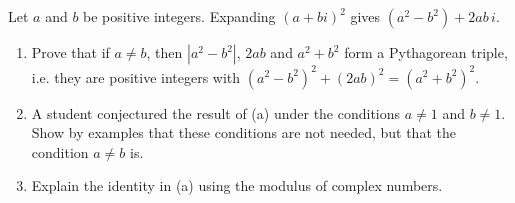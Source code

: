Let $a$ and $b$ be positive integers. Expanding $(a+bi)^2$ gives $\left(a^2-b^2\right)+2ab\,i$.
\begin{enumerate}
\item[(a)] Prove that if $a\ne b$, then $\left|a^2-b^2\right|$, $2ab$ and $a^2+b^2$ form a Pythagorean triple, i.e. they are positive integers with $\left(a^2-b^2\right)^2+(2ab)^2=\left(a^2+b^2\right)^2$.
\item[(b)] A student conjectured the result of (a) under the conditions $a\ne1$ and $b\ne1$. Show by examples that these conditions are not needed, but that the condition $a\ne b$ is.
\item[(c)] Explain the identity in (a) using the modulus of complex numbers.
\end{enumerate}
